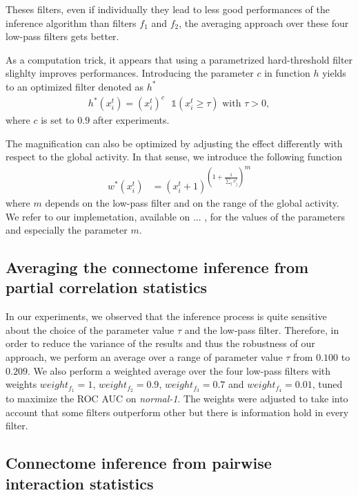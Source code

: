 \documentclass[wcp]{jmlr}
\begin{document}
Theses filters, even if individually they lead to less good performances of the inference algorithm than filters $f_1$ and
$f_2$, the averaging approach over these four low-pass
filters gets better.

As a computation trick, it appears that using a parametrized hard-threshold filter slighlty improves performances. Introducing the parameter $c$ in function $h$ yields to an optimized filter denoted as $h^*$
\begin{align}
h^*(x^t_i) = (x_i^t)^c \text{ } \mathbb{1}(x_i^t \ge \tau) \text{ with } \tau > 0,
\end{align}
where $c$ is set to $0.9$ after experiments.

The magnification can also be optimized by adjusting the effect differently with respect to the global activity. In that sense, we introduce the following function
\begin{align}
 w^*(x^{t}_i) &= {(x^{t}_i + 1 )^{\left (1 + \frac{1}{\sum_{j} x^{t}_j}\right )}}^{m}
\end{align}
where $m$ depends on the low-pass filter and on the range of the global activity. We refer to our implemetation, available on ... , for the values of the parameters and especially the parameter $m$.

\subsection*{Averaging the connectome inference from partial correlation statistics}

In our experiments, we observed that the inference process is quite sensitive about the choice of the parameter value $\tau$ and the low-pass filter. Therefore, in order to reduce the variance of the results and thus the robustness of our approach, we perform an average over a range of parameter value $\tau$ from $0.100$ to $0.209$. We also perform a weighted average over the four low-pass filters with weights 
$weight_{f_1} = 1$, $weight_{f_2} = 0.9$, $weight_{f_3} = 0.7$ and $weight_{f_4} = 0.01$, tuned to maximize the ROC AUC on \textit{normal-1}.
The weights were adjusted to take into account that some filters outperform other but there is information hold in every filter.



\subsection*{Connectome inference from pairwise interaction statistics}
\end{document}
